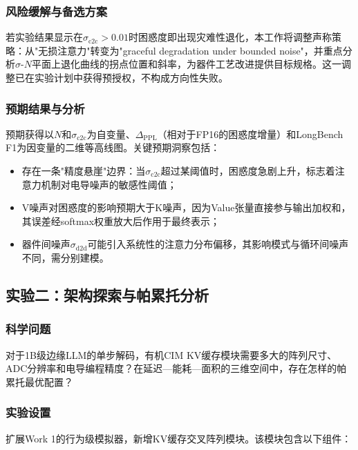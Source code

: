 \subsubsection{风险缓解与备选方案}

若实验结果显示在$\sigma_{\text{c2c}} > 0.01$时困惑度即出现灾难性退化，本工作将调整声称策略：从"无损注意力"转变为"graceful degradation under bounded noise"，并重点分析$\sigma$-$N$平面上退化曲线的拐点位置和斜率，为器件工艺改进提供目标规格。这一调整已在实验计划中获得预授权，不构成方向性失败。

\subsubsection{预期结果与分析}

预期获得以$N$和$\sigma_{\text{c2c}}$为自变量、$\Delta_{\text{PPL}}$（相对于FP16的困惑度增量）和LongBench F1为因变量的二维等高线图。关键预期洞察包括：

\begin{itemize}
    \item 存在一条"精度悬崖"边界：当$\sigma_{\text{c2c}}$超过某阈值时，困惑度急剧上升，标志着注意力机制对电导噪声的敏感性阈值；
    \item V噪声对困惑度的影响预期大于K噪声，因为Value张量直接参与输出加权和，其误差经softmax权重放大后作用于最终表示；
    \item 器件间噪声$\sigma_{\text{d2d}}$可能引入系统性的注意力分布偏移，其影响模式与循环间噪声不同，需分别建模。
\end{itemize}

\subsection{实验二：架构探索与帕累托分析}
\label{sec:exp2_arch}

\subsubsection{科学问题}

对于1B级边缘LLM的单步解码，有机CIM KV缓存模块需要多大的阵列尺寸、ADC分辨率和电导编程精度？在延迟—能耗—面积的三维空间中，存在怎样的帕累托最优配置？

\subsubsection{实验设置}

扩展Work 1的行为级模拟器，新增KV缓存交叉阵列模块。该模块包含以下组件：

